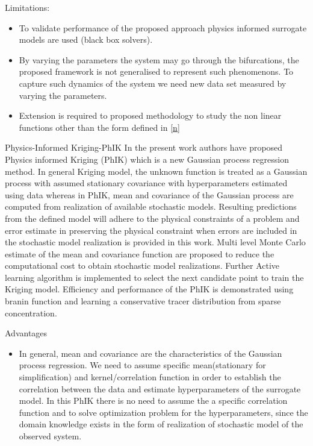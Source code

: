\documentclass[a4sheet,12pt]{article}
\numberwithin{equation}{section}
\theoremstyle{remark}
\begin{document}
\begin{subsection}{Limitations:}
\begin{itemize}
    \item To validate performance of the proposed approach physics informed surrogate models are used (black box solvers).
    \item By varying the parameters the system may go through the bifurcations, the proposed framework is not generalised to represent such phenomenons. To capture such dynamics of the system we need new data set measured by varying the parameters.  
    \item Extension is required to proposed methodology to study the non linear functions other than the form defined in \ref{n}
\end{itemize}
\end{subsection}
\begin{section}{Physics-Informed Kriging-PhIK}\cite{yang2018physics}
In the present work authors have proposed Physics informed Kriging (PhIK) which is a new Gaussian process regression method. In general Kriging model, the unknown function is treated as a Gaussian process with assumed stationary covariance with hyperparameters estimated using data whereas in PhIK, mean and covariance of the Gaussian process are computed from realization of available stochastic models. Resulting predictions from the defined model will adhere to the physical constraints of a problem and error estimate in preserving the physical constraint when errors are included in the stochastic model realization is provided in this work. Multi level Monte Carlo estimate of the mean and covariance function are proposed to reduce the computational cost to obtain stochastic model realizations. Further Active learning algorithm is implemented to select the next candidate point to train the Kriging model. Efficiency and performance of the PhIK  is demonstrated using branin function and learning a conservative tracer distribution from sparse concentration.
\begin{subsection}{Advantages}
\begin{itemize}
    \item In general, mean and covariance are the characteristics of the Gaussian process regression. We need to assume specific mean(stationary for simplification) and kernel/correlation function in order to establish the correlation between the data and estimate hyperparameters of the surrogate model. In this PhIK there is no need to assume the a specific correlation function and to solve optimization problem for the hyperparameters, since the domain knowledge exists in the form of realization of stochastic model of the observed system.

\end{itemize}
\end{subsection}
\end{section}
\end{document}
